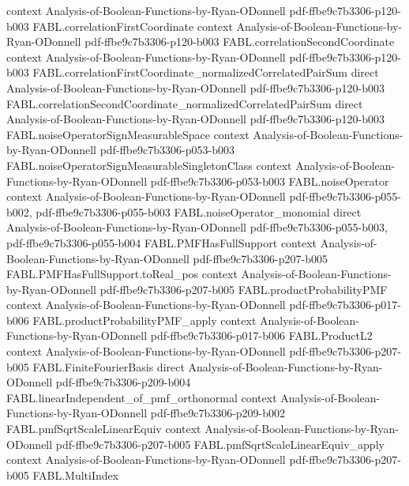 \begin{theorem}
  {context}
  {Analysis-of-Boolean-Functions-by-Ryan-ODonnell}
  {pdf-ffbe9c7b3306-p120-b003}
\proofstep
  {FABL.correlationFirstCoordinate}
  {context}
  {Analysis-of-Boolean-Functions-by-Ryan-ODonnell}
  {pdf-ffbe9c7b3306-p120-b003}
\proofstep
  {FABL.correlationSecondCoordinate}
  {context}
  {Analysis-of-Boolean-Functions-by-Ryan-ODonnell}
  {pdf-ffbe9c7b3306-p120-b003}
\proofstep
  {FABL.correlationFirstCoordinate_normalizedCorrelatedPairSum}
  {direct}
  {Analysis-of-Boolean-Functions-by-Ryan-ODonnell}
  {pdf-ffbe9c7b3306-p120-b003}
\proofstep
  {FABL.correlationSecondCoordinate_normalizedCorrelatedPairSum}
  {direct}
  {Analysis-of-Boolean-Functions-by-Ryan-ODonnell}
  {pdf-ffbe9c7b3306-p120-b003}
\proofstep
  {FABL.noiseOperatorSignMeasurableSpace}
  {context}
  {Analysis-of-Boolean-Functions-by-Ryan-ODonnell}
  {pdf-ffbe9c7b3306-p053-b003}
\proofstep
  {FABL.noiseOperatorSignMeasurableSingletonClass}
  {context}
  {Analysis-of-Boolean-Functions-by-Ryan-ODonnell}
  {pdf-ffbe9c7b3306-p053-b003}
\proofstep
  {FABL.noiseOperator}
  {context}
  {Analysis-of-Boolean-Functions-by-Ryan-ODonnell}
  {pdf-ffbe9c7b3306-p055-b002,
    pdf-ffbe9c7b3306-p055-b003}
\proofstep
  {FABL.noiseOperator_monomial}
  {direct}
  {Analysis-of-Boolean-Functions-by-Ryan-ODonnell}
  {pdf-ffbe9c7b3306-p055-b003,
    pdf-ffbe9c7b3306-p055-b004}
\proofstep
  {FABL.PMFHasFullSupport}
  {context}
  {Analysis-of-Boolean-Functions-by-Ryan-ODonnell}
  {pdf-ffbe9c7b3306-p207-b005}
\proofstep
  {FABL.PMFHasFullSupport.toReal_pos}
  {context}
  {Analysis-of-Boolean-Functions-by-Ryan-ODonnell}
  {pdf-ffbe9c7b3306-p207-b005}
\proofstep
  {FABL.productProbabilityPMF}
  {context}
  {Analysis-of-Boolean-Functions-by-Ryan-ODonnell}
  {pdf-ffbe9c7b3306-p017-b006}
\proofstep
  {FABL.productProbabilityPMF_apply}
  {context}
  {Analysis-of-Boolean-Functions-by-Ryan-ODonnell}
  {pdf-ffbe9c7b3306-p017-b006}
\proofstep
  {FABL.ProductL2}
  {context}
  {Analysis-of-Boolean-Functions-by-Ryan-ODonnell}
  {pdf-ffbe9c7b3306-p207-b005}
\proofstep
  {FABL.FiniteFourierBasis}
  {direct}
  {Analysis-of-Boolean-Functions-by-Ryan-ODonnell}
  {pdf-ffbe9c7b3306-p209-b004}
\proofstep
  {FABL.linearIndependent_of_pmf_orthonormal}
  {context}
  {Analysis-of-Boolean-Functions-by-Ryan-ODonnell}
  {pdf-ffbe9c7b3306-p209-b002}
\proofstep
  {FABL.pmfSqrtScaleLinearEquiv}
  {context}
  {Analysis-of-Boolean-Functions-by-Ryan-ODonnell}
  {pdf-ffbe9c7b3306-p207-b005}
\proofstep
  {FABL.pmfSqrtScaleLinearEquiv_apply}
  {context}
  {Analysis-of-Boolean-Functions-by-Ryan-ODonnell}
  {pdf-ffbe9c7b3306-p207-b005}
\proofstep
  {FABL.MultiIndex}

\end{theorem}
